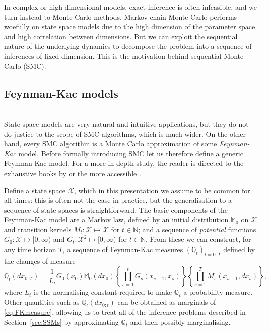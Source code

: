 In complex or high-dimensional models, exact inference is often infeasible, and we turn instead to Monte Carlo methods.
Markov chain Monte Carlo performs woefully on state space models due to the high dimension of the parameter space and high correlation between dimensions. 
But we can exploit the sequential nature of the underlying dynamics to decompose the problem into a sequence of inferences of fixed dimension.
This is the motivation behind sequential Monte Carlo (SMC).


\subsection{Feynman-Kac models}
\label{sec:FKmodels}
\\
State space models are very natural and intuitive applications, but they do not do justice to the scope of SMC algorithms, which is much wider.
On the other hand, 
every SMC algorithm is a Monte Carlo approximation of some \emph{Feynman-Kac} model.
Before formally introducing SMC let us therefore define a generic Feynman-Kac model.
For a more in-depth study, the reader is directed to the exhaustive books by \textcite{delmoral2004, delmoral2013} or the more accessible \textcite[Chapter 5]{chopin2020}.

Define a state space $\mathcal{X}$, which in this presentation we assume to be common for all times: this is often not the case in practice, but the generalisation to a sequence of state spaces is straightforward.
The basic components of the Feynman-Kac model are a Markov law, defined by an initial distribution $\mathbb{M}_0$ on $\mathcal{X}$ and transition kernels $M_t: \mathcal{X} \mapsto \mathcal{X}$ for $t\in\mathbb{N}$; and a sequence of \emph{potential} functions $G_0 : \mathcal{X} \mapsto [0,\infty)$  and $G_t : \mathcal{X}^2 \mapsto [0,\infty)$ for $t\in\mathbb{N}$.
From these we can construct, for any time horizon $T$, a sequence of Feynman-Kac measures $(\mathbb{Q}_t)_{t=0:T}$ defined by the changes of measure
\begin{equation}
\mathbb{Q}_t (dx_{0:T}) = \frac{1}{L_t} G_0(x_0) \mathbb{M}_0(dx_0)
        \left\{ \prod_{s=1}^t G_s(x_{s-1}, x_s) \right\} 
        \left\{ \prod_{s=1}^T M_s(x_{s-1}, dx_s) \right\} , \label{eq:FKmeasure}
\end{equation}
where $L_t$ is the normalising constant required to make $\mathbb{Q}_t$ a probability measure. Other quantities such as $\mathbb{Q}_t (dx_{0:t})$ can be obtained as marginals of \eqref{eq:FKmeasure}, allowing us to treat all of the inference problems described in Section~\ref{sec:SSMs} by approximating $\mathbb{Q}_t$ and then possibly marginalising.


